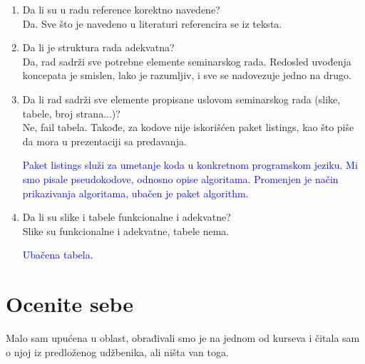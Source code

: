 \documentclass[a4paper]{report}
\newcommand{\odgovor}[1]{\textcolor{blue}{#1}}
\begin{document}
\begin{enumerate}
\begin{verbatim}
\usepackage[utf8]{inputenc}
\usepackage[english,serbian]{babel}
\usepackage[fixlanguage]{babelbib}
\end{verbatim}

I navođenjem literature na sledeći način:

\begin{verbatim}
\addcontentsline{toc}{section}{Literatura}
\appendix
\selectbiblanguage{serbian}


\end{verbatim}


\odgovor{Ispravljeno za mesece. Obrisano online at.}

\item Da li su u radu reference korektno navedene?\\
Da. Sve što je navedeno u literaturi referencira se iz teksta.

\item Da li je struktura rada adekvatna?\\
Da, rad sadrži sve potrebne elemente seminarskog rada. Redosled uvođenja koncepata je smislen, lako je razumljiv, i sve se nadovezuje jedno na drugo.

\item Da li rad sadrži sve elemente propisane uslovom seminarskog rada (slike, tabele, broj strana...)?\\
Ne, fail tabela. Takođe, za kodove nije iskorišćen paket listings, kao što piše da mora u prezentaciji sa predavanja.

\odgovor{Paket listings služi za umetanje koda u konkretnom programskom jeziku. Mi smo pisale pseudokodove, odnosno opise algoritama. Promenjen je način prikazivanja algoritama, ubačen je paket algorithm.}

\item Da li su slike i tabele funkcionalne i adekvatne?\\
Slike su funkcionalne i adekvatne, tabele nema.

\odgovor{Ubačena tabela.}
\end{enumerate}

\section{Ocenite sebe}
Malo sam upućena u oblast, obrađivali smo je na jednom od kurseva i čitala sam o njoj iz predloženog udžbenika, ali ništa van toga.
\end{document}
